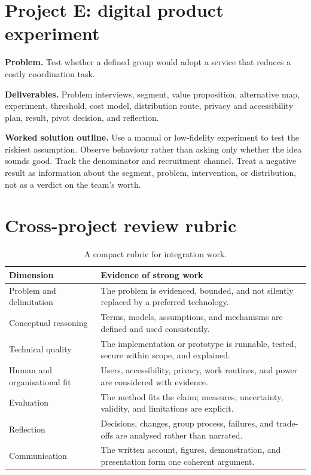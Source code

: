 \section{Project E: digital product experiment}
\textbf{Problem.} Test whether a defined group would adopt a service that reduces a costly coordination task.

\textbf{Deliverables.} Problem interviews, segment, value proposition, alternative map, experiment, threshold, cost model, distribution route, privacy and accessibility plan, result, pivot decision, and reflection.

\textbf{Worked solution outline.} Use a manual or low-fidelity experiment to test the riskiest assumption. Observe behaviour rather than asking only whether the idea sounds good. Track the denominator and recruitment channel. Treat a negative result as information about the segment, problem, intervention, or distribution, not as a verdict on the team's worth.

\section{Cross-project review rubric}
\begin{longtable}{p{}p{}}
\caption{A compact rubric for integration work.}\\
\toprule
\textbf{Dimension} & \textbf{Evidence of strong work}\\
\midrule
Problem and delimitation & The problem is evidenced, bounded, and not silently replaced by a preferred technology.\\
Conceptual reasoning & Terms, models, assumptions, and mechanisms are defined and used consistently.\\
Technical quality & The implementation or prototype is runnable, tested, secure within scope, and explained.\\
Human and organisational fit & Users, accessibility, privacy, work routines, and power are considered with evidence.\\
Evaluation & The method fits the claim; measures, uncertainty, validity, and limitations are explicit.\\
Reflection & Decisions, changes, group process, failures, and trade-offs are analysed rather than narrated.\\
Communication & The written account, figures, demonstration, and presentation form one coherent argument.\\
\bottomrule
\end{longtable}

